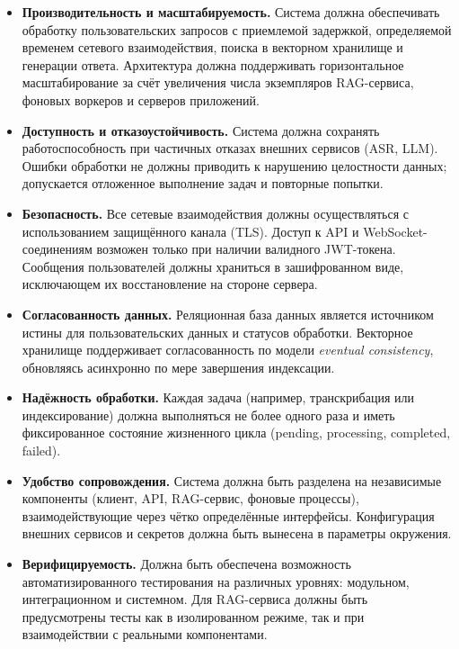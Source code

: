 \documentclass{article}
\begin{document}
\begin{itemize}

\item \textbf{Производительность и масштабируемость.}  
Система должна обеспечивать обработку пользовательских запросов с приемлемой задержкой, определяемой временем сетевого взаимодействия, поиска в векторном хранилище и генерации ответа. Архитектура должна поддерживать горизонтальное масштабирование за счёт увеличения числа экземпляров RAG-сервиса, фоновых воркеров и серверов приложений.

\item \textbf{Доступность и отказоустойчивость.}  
Система должна сохранять работоспособность при частичных отказах внешних сервисов (ASR, LLM). Ошибки обработки не должны приводить к нарушению целостности данных; допускается отложенное выполнение задач и повторные попытки.

\item \textbf{Безопасность.}  
Все сетевые взаимодействия должны осуществляться с использованием защищённого канала (TLS). Доступ к API и WebSocket-соединениям возможен только при наличии валидного JWT-токена. Сообщения пользователей должны храниться в зашифрованном виде, исключающем их восстановление на стороне сервера.

\item \textbf{Согласованность данных.}  
Реляционная база данных является источником истины для пользовательских данных и статусов обработки. Векторное хранилище поддерживает согласованность по модели \emph{eventual consistency}, обновляясь асинхронно по мере завершения индексации.

\item \textbf{Надёжность обработки.}  
Каждая задача (например, транскрибация или индексирование) должна выполняться не более одного раза и иметь фиксированное состояние жизненного цикла (pending, processing, completed, failed).

\item \textbf{Удобство сопровождения.}  
Система должна быть разделена на независимые компоненты (клиент, API, RAG-сервис, фоновые процессы), взаимодействующие через чётко определённые интерфейсы. Конфигурация внешних сервисов и секретов должна быть вынесена в параметры окружения.

\item \textbf{Верифицируемость.}  
Должна быть обеспечена возможность автоматизированного тестирования на различных уровнях: модульном, интеграционном и системном. Для RAG-сервиса должны быть предусмотрены тесты как в изолированном режиме, так и при взаимодействии с реальными компонентами.

\end{itemize}
\end{document}
